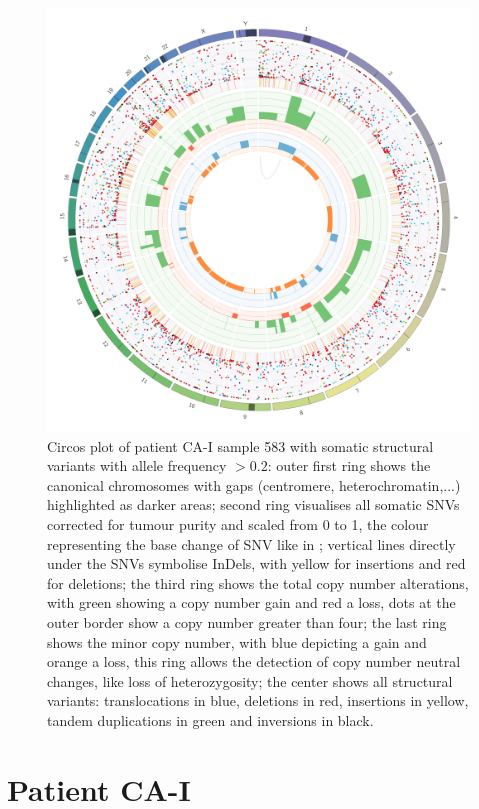 \begin{figure}[ht]
\centering
\includegraphics[width=.99\linewidth]{Figures/CASCADE/CA51/CA51-583.circos.png}
\caption[Circos plot of patient CA-I sample 583]{Circos plot of patient CA-I sample 583 with somatic structural variants with allele frequency $> 0.2$: outer first ring shows the canonical chromosomes with gaps (centromere, heterochromatin,...) highlighted as darker areas; second ring visualises all somatic SNVs corrected for tumour purity and scaled from 0 to 1, the colour representing the base change of SNV like in \protect\textcite{Alexandrov2013}; vertical lines directly under the SNVs symbolise InDels, with yellow for insertions and red for deletions; the third ring shows the total copy number alterations, with green showing a copy number gain and red a loss, dots at the outer border show a copy number greater than four; the last ring shows the minor copy number, with blue depicting a gain and orange a loss, this ring allows the detection of copy number neutral changes, like loss of heterozygosity; the center shows all structural variants: translocations in blue, deletions in red, insertions in yellow, tandem duplications in green and inversions in black.} \label{fig:ca51.583circos}
\end{figure}


\cleardoublepage
\section{Patient CA-I}

